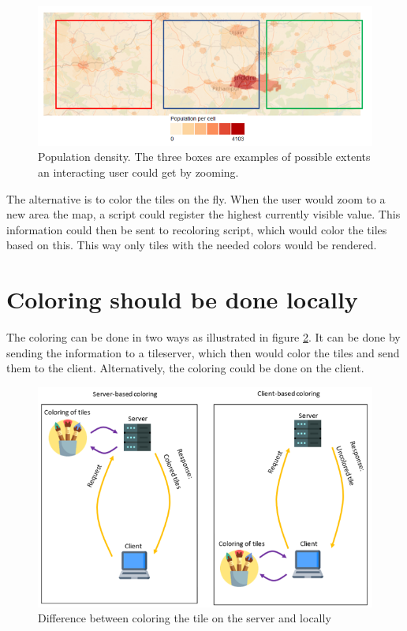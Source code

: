 \begin{figure} [H]
	\centering
	\includegraphics[width=.8\textwidth]{Pictures/WhyNotPrecolor}
	\caption{Population density. The three boxes are examples of possible extents an interacting user could get by zooming.}
	\label{WhyNotPrecolor}
\end{figure}

The alternative is to color the tiles on the fly. When the user would zoom to a new area the map, a script could register the highest currently visible value. This information could then be sent to recoloring script, which would color the tiles based on this. This way only tiles with the needed colors would be rendered. 


\section{Coloring should be done locally}
The coloring can be done in two ways as illustrated in figure \ref{WhyColorLocally}. It can be done by sending the information to a tileserver, which then would color the tiles and send them to the client. Alternatively, the coloring could be done on the client. 

\begin{figure} [H]
	\centering
	\includegraphics[width=.8\textwidth]{Pictures/WhyColorLocally}
	\caption{Difference between coloring the tile on the server and locally}
	\label{WhyColorLocally}
\end{figure}

